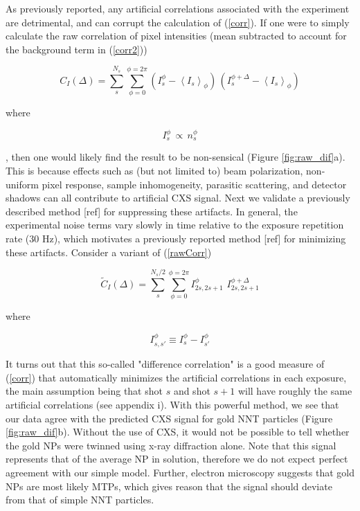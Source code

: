 \documentclass [11pt,fleqn]{article}
\def \be {\begin{equation}}
\def \ee {\end{equation}}
\begin{document}
As previously reported, any artificial correlations associated with the experiment are detrimental, and can corrupt the calculation of (\ref {corr}). If one were to simply calculate the raw correlation of pixel intensities (mean subtracted to account for the background term in (\ref{corr2}))

\be \label{rawCorr}
C_I (\Delta) = \sum_s^{N_s} \sum_{\phi=0}^{\phi=2\pi} \left( I_s^\phi  - \left \langle {I_s} \right \rangle _\phi \right)\,\left(I_s^{\phi+\Delta}  - \left\langle {I_s}\right\rangle _\phi \right)
\ee

where 

\be
I_s^\phi \, \propto \, n_s^\phi
\ee 

, then one would likely find the result to be non-sensical (Figure \ref{fig:raw_dif}a). This is because effects such as (but not limited to) beam polarization, non-uniform pixel response, sample inhomogeneity, parasitic scattering, and detector shadows can all contribute to artificial CXS signal. Next we validate a previously described method [ref] for suppressing these artifacts. In general, the experimental noise terms vary slowly in time relative to the exposure repetition rate ($30$ Hz), which motivates a previously reported method [ref] for minimizing these artifacts. Consider a variant of (\ref{rawCorr})

\be \label{cdif}
\tilde{C}_I(\Delta) = \sum _s^{N_s/2} \sum_{\phi=0}^{\phi=2\pi} I_{2s, 2s+1}^\phi\,\, I_{2s,2s+1}^{\phi + \Delta} 
\ee

where

\be
I_{s,s'}^\phi \equiv I_s^\phi - I_{s'}^\phi 
\ee

It turns out that this so-called "difference correlation" is a good measure of (\ref{corr}) that automatically minimizes the artificial correlations in each exposure, the main assumption being that shot $s$ and shot $s+1$ will have roughly the same artificial correlations (see appendix i). With this powerful method, we see that our data agree with the predicted CXS signal for gold NNT particles (Figure \ref{fig:raw_dif}b). Without the use of CXS, it would not be possible to tell whether the gold NPs were twinned using x-ray diffraction alone. Note that this signal represents that of the average NP in solution, therefore we do not expect perfect agreement with our simple model. Further, electron microscopy suggests that gold NPs are most likely MTPs, which gives reason that the signal should deviate from that of simple NNT particles.
\end{document}
